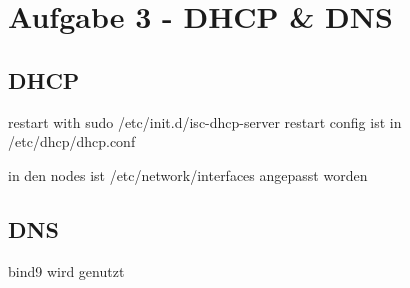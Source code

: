 \chapter{Aufgabe 3 - DHCP \& DNS}
\section{DHCP}
restart with
sudo /etc/init.d/isc-dhcp-server restart
config ist in /etc/dhcp/dhcp.conf

in den nodes ist /etc/network/interfaces angepasst worden

\section{DNS}
bind9 wird genutzt

